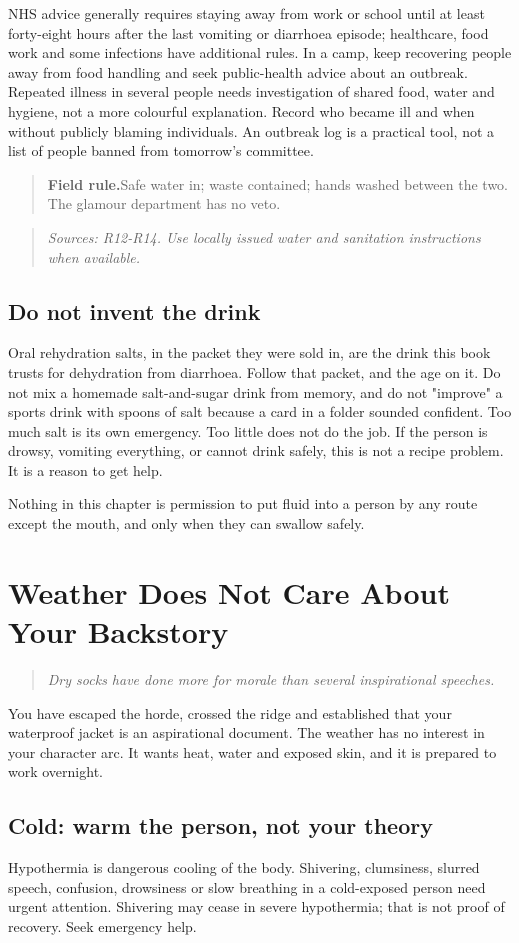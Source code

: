 \documentclass[10pt,openright]{book}
\newcommand{\fieldrule}[1]{\begin{quote}\textbf{Field rule.}\enspace #1\end{quote}}
\begin{document}
NHS advice generally requires staying away from work or school until at least forty-eight hours after the last vomiting or diarrhoea episode; healthcare, food work and some infections have additional rules. In a camp, keep recovering people away from food handling and seek public-health advice about an outbreak. Repeated illness in several people needs investigation of shared food, water and hygiene, not a more colourful explanation. Record who became ill and when without publicly blaming individuals. An outbreak log is a practical tool, not a list of people banned from tomorrow's committee.

\fieldrule{Safe water in; waste contained; hands washed between the two. The glamour department has no veto.}
\begin{quote}\emph{Sources: R12-R14. Use locally issued water and sanitation instructions when available.}\end{quote}
\section*{Do not invent the drink}
Oral rehydration salts, in the packet they were sold in, are the drink this book trusts for dehydration from diarrhoea. Follow that packet, and the age on it. Do not mix a homemade salt-and-sugar drink from memory, and do not "improve" a sports drink with spoons of salt because a card in a folder sounded confident. Too much salt is its own emergency. Too little does not do the job. If the person is drowsy, vomiting everything, or cannot drink safely, this is not a recipe problem. It is a reason to get help.

Nothing in this chapter is permission to put fluid into a person by any route except the mouth, and only when they can swallow safely.

\chapter{Weather Does Not Care About Your Backstory}
\begin{quote}\emph{Dry socks have done more for morale than several inspirational speeches.}\end{quote}
You have escaped the horde, crossed the ridge and established that your waterproof jacket is an aspirational document. The weather has no interest in your character arc. It wants heat, water and exposed skin, and it is prepared to work overnight.

\section*{Cold: warm the person, not your theory}
Hypothermia is dangerous cooling of the body. Shivering, clumsiness, slurred speech, confusion, drowsiness or slow breathing in a cold-exposed person need urgent attention. Shivering may cease in severe hypothermia; that is not proof of recovery. Seek emergency help.
\end{document}
